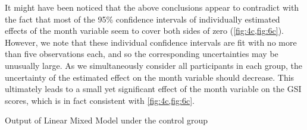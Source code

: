 \noindent\noindent It might have been noticed that the above conclusions appear to contradict with the fact that most of the 95\% confidence intervals of individually estimated effects of the month variable seem to cover both sides of zero (\cref{fig:4c,fig:6c}). However, we note that these individual confidence intervals are fit with no more than five observations each, and so the corresponding uncertainties may be unusually large. As we simultaneously consider all participants in each group, the uncertainty of the estimated effect on the month variable should decrease. This ultimately leads to a small yet significant effect of the month variable on the GSI scores, which is in fact consistent with \cref{fig:4c,fig:6c}.\\
\begin{table}[t]
\begin{minipage}{0.5\textwidth}
\centering
{}
\caption{Output of Linear Mixed Model under the control group}
\label{tab:lme.control}
\end{minipage}
\hfill
\begin{minipage}{0.5\textwidth}
\centering
{}
\caption{Output of GEE model under the control group}
\label{tab:gee.control}
\end{minipage}
\end{table}
